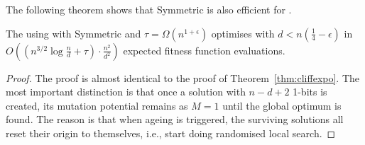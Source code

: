 \documentclass[lettersize,journal]{IEEEtran}
\begin{document}
The following theorem shows that Symmetric {\expoHD } is also efficient for \cliff.
\begin{theorem} \label{th:expoHD-cliff}
The {\oneoneOPTIA } using \IPHfcm{} with Symmetric {\expoHD } and $\tau=\Omega(n^{1+\epsilon})$ optimises \cliff{} with 
$d<n(\frac{1}{4}-\epsilon)$ in 
 {\color{blue} $O\left( \left(n^{3/2}\log{\frac{n}{d}}+\tau \right)\cdot \frac{n^2}{d^2}\right)$ } expected fitness function evaluations.
\end{theorem} 

\begin{proof}
The proof is almost identical to the proof of 
Theorem~\ref{thm:cliffexpo}. The most important distinction is that once a 
solution with $n-d+2$ 1-bits is created, its mutation potential remains as $M=1$ until the global optimum is found. The reason is that when ageing is triggered, the surviving 
solutions all reset their origin to themselves, i.e., start 
doing randomised local search. 

% 
% 
\end{proof}
\end{document}
